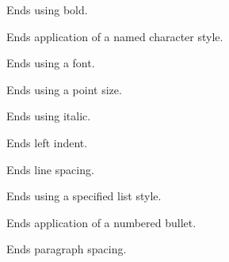 
Ends using bold.

\label{wxrichtextctrlendcharacterstyle}


Ends application of a named character style.

\label{wxrichtextctrlendfont}


Ends using a font.

\label{wxrichtextctrlendfontsize}


Ends using a point size.

\label{wxrichtextctrlenditalic}


Ends using italic.

\label{wxrichtextctrlendleftindent}


Ends left indent.

\label{wxrichtextctrlendlinespacing}


Ends line spacing.

\label{wxrichtextctrlendliststyle}


Ends using a specified list style.

\label{wxrichtextctrlendnumberedbullet}


Ends application of a numbered bullet.

\label{wxrichtextctrlendparagraphspacing}


Ends paragraph spacing.

\label{wxrichtextctrlendparagraphstyle}

